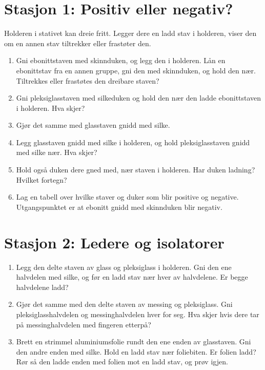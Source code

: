 \documentclass[11pt]{article}
\begin{document}
\section*{Stasjon 1: Positiv eller negativ?}

Holderen i stativet kan dreie fritt. Legger dere en ladd stav i holderen, viser den om en annen stav tiltrekker eller frastøter den.

\begin{enumerate}
\item Gni ebonittstaven med skinnduken, og legg den i holderen. Lån en ebonittstav fra en annen gruppe, gni den med skinnduken, og hold den nær. Tiltrekkes eller frastøtes den dreibare staven?
\item Gni pleksiglasstaven med silkeduken og hold den nær den ladde ebonittstaven i holderen. Hva skjer?
\item Gjør det samme med glasstaven gnidd med silke.
\item Legg glasstaven gnidd med silke i holderen, og hold pleksiglasstaven gnidd med silke nær. Hva skjer?
\item Hold også duken dere gned med, nær staven i holderen. Har duken ladning? Hvilket fortegn?
\item Lag en tabell over hvilke staver og duker som blir positive og negative. Utgangspunktet er at ebonitt gnidd med skinnduken blir negativ.
\end{enumerate}

\section*{Stasjon 2: Ledere og isolatorer}

\begin{enumerate}
\item Legg den delte staven av glass og pleksiglass i holderen. Gni den ene halvdelen med silke, og før en ladd stav nær hver av halvdelene. Er begge halvdelene ladd?
\item Gjør det samme med den delte staven av messing og pleksiglass. Gni pleksiglasshalvdelen og messinghalvdelen hver for seg. Hva skjer hvis dere tar på messinghalvdelen med fingeren etterpå?
\item Brett en strimmel aluminiumsfolie rundt den ene enden av glasstaven. Gni den andre enden med silke. Hold en ladd stav nær foliebiten. Er folien ladd? Rør så den ladde enden med folien mot en ladd stav, og prøv igjen.
\end{enumerate}
\end{document}
